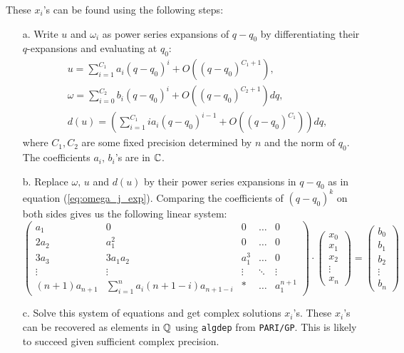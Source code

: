 \begin{algorithm}
\begin{enumerate}
These $x_i$'s can be found using the following steps:
\begin{enumerate}
    \item[a.] Write $u$ and $\omega_i$ as power series expansions of $q-q_0$ by differentiating their $q$-expansions and evaluating at $q_0$:
    \begin{align*}
    & u = \sum_{i=1}^{C_1} a_i(q-q_0)^i + O((q-q_0)^{C_1+1}),\\
    & \omega = \sum_{i=0}^{C_2} b_i(q-q_0)^i + O((q-q_0)^{C_2+1})dq,\\
    & d(u) = (\sum_{i=1}^{C_1} ia_i(q-q_0)^{i-1} + O((q-q_0)^{C_1}))dq,
\end{align*}
    where $C_1,C_2$ are some fixed precision determined by $n$ and the norm of $q_0$. The coefficients $a_i,\,b_i$'s are in $\mathbb{C}$.
    \item[b.] Replace $\omega,\,u$ and $d(u)$ by their power series expansions in $q-q_0$ as in equation (\ref{eq:omega_j_exp}). Comparing the coefficients of $(q-q_0)^k$ on both sides gives us the following linear system:
    \[
\begin{pmatrix}
    a_1       & 0 & 0 & \dots & 0 \\
    2a_2       & a_1^2 & 0 & \dots & 0 \\
    3a_3       & 3a_1a_2 & a_1^3 & \dots & 0\\
    \vdots       & \vdots & \vdots & \ddots & \vdots    \\
    (n+1)a_{n+1}      & \sum_{i=1}^{n}a_i(n+1-i)a_{n+1-i} &* & \dots & a_1^{n+1}
\end{pmatrix} \cdot
\begin{pmatrix}
    x_0      \\
    x_1      \\
    x_2     \\
    \vdots   \\
    x_n
\end{pmatrix} = 
\begin{pmatrix}
    b_0   \\
    b_1     \\
    b_2  \\
    
    \vdots   \\
    b_n
\end{pmatrix}
\]
\item[c.] Solve this system of equations and get complex solutions $x_i$'s. These $x_i$'s can be recovered as elements in $\mathbb{Q}$ using \texttt{algdep} from \texttt{PARI/GP}. This is likely to succeed given sufficient complex precision.


\end{enumerate}
\end{enumerate}
\end{algorithm}

